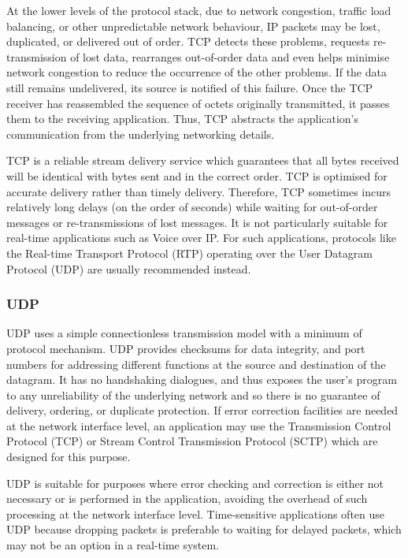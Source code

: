 At the lower levels of the protocol stack, due to network congestion, traffic load balancing, or other unpredictable network behaviour, IP packets may be lost, duplicated, or delivered out of order. TCP detects these problems, requests re-transmission of lost data, rearranges out-of-order data and even helps minimise network congestion to reduce the occurrence of the other problems. If the data still remains undelivered, its source is notified of this failure. Once the TCP receiver has reassembled the sequence of octets originally transmitted, it passes them to the receiving application. Thus, TCP abstracts the application's communication from the underlying networking details.

TCP is a reliable stream delivery service which guarantees that all bytes received will be identical with bytes sent and in the correct order. TCP is optimised for accurate delivery rather than timely delivery. Therefore, TCP sometimes incurs relatively long delays (on the order of seconds) while waiting for out-of-order messages or re-transmissions of lost messages. It is not particularly suitable for real-time applications such as Voice over IP. For such applications, protocols like the Real-time Transport Protocol (RTP) operating over the User Datagram Protocol (UDP) are usually recommended instead.

\subsubsection{UDP}
UDP uses a simple connectionless transmission model with a minimum of protocol mechanism. UDP provides checksums for data integrity, and port numbers for addressing different functions at the source and destination of the datagram. It has no handshaking dialogues, and thus exposes the user's program to any unreliability of the underlying network and so there is no guarantee of delivery, ordering, or duplicate protection. If error correction facilities are needed at the network interface level, an application may use the Transmission Control Protocol (TCP) or Stream Control Transmission Protocol (SCTP) which are designed for this purpose.

UDP is suitable for purposes where error checking and correction is either not necessary or is performed in the application, avoiding the overhead of such processing at the network interface level. Time-sensitive applications often use UDP because dropping packets is preferable to waiting for delayed packets, which may not be an option in a real-time system.

